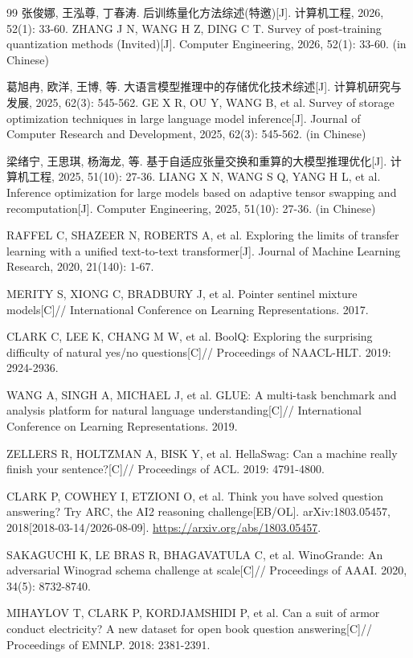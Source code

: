 \begin{thebibliography}{99}
张俊娜, 王泓尊, 丁春涛.
后训练量化方法综述(特邀)[J].
计算机工程, 2026, 52(1): 33-60.
ZHANG J N, WANG H Z, DING C T. Survey of post-training quantization methods (Invited)[J].
Computer Engineering, 2026, 52(1): 33-60. (in Chinese)

葛旭冉, 欧洋, 王博, 等.
大语言模型推理中的存储优化技术综述[J].
计算机研究与发展, 2025, 62(3): 545-562.
GE X R, OU Y, WANG B, et al. Survey of storage optimization techniques in large language model inference[J].
Journal of Computer Research and Development, 2025, 62(3): 545-562. (in Chinese)

梁绪宁, 王思琪, 杨海龙, 等.
基于自适应张量交换和重算的大模型推理优化[J].
计算机工程, 2025, 51(10): 27-36.
LIANG X N, WANG S Q, YANG H L, et al. Inference optimization for large models based on adaptive tensor swapping and recomputation[J].
Computer Engineering, 2025, 51(10): 27-36. (in Chinese)

RAFFEL C, SHAZEER N, ROBERTS A, et al.
Exploring the limits of transfer learning with a unified text-to-text transformer[J].
Journal of Machine Learning Research, 2020, 21(140): 1-67.

MERITY S, XIONG C, BRADBURY J, et al.
Pointer sentinel mixture models[C]//
International Conference on Learning Representations.
2017.

CLARK C, LEE K, CHANG M W, et al.
BoolQ: Exploring the surprising difficulty of natural yes/no questions[C]//
Proceedings of NAACL-HLT.
2019: 2924-2936.

WANG A, SINGH A, MICHAEL J, et al.
GLUE: A multi-task benchmark and analysis platform for natural language understanding[C]//
International Conference on Learning Representations.
2019.

ZELLERS R, HOLTZMAN A, BISK Y, et al.
HellaSwag: Can a machine really finish your sentence?[C]//
Proceedings of ACL.
2019: 4791-4800.

CLARK P, COWHEY I, ETZIONI O, et al.
Think you have solved question answering? Try ARC, the AI2 reasoning challenge[EB/OL].
arXiv:1803.05457, 2018[2018-03-14/2026-08-09].
\url{https://arxiv.org/abs/1803.05457}.

SAKAGUCHI K, LE BRAS R, BHAGAVATULA C, et al.
WinoGrande: An adversarial Winograd schema challenge at scale[C]//
Proceedings of AAAI.
2020, 34(5): 8732-8740.

MIHAYLOV T, CLARK P, KORDJAMSHIDI P, et al.
Can a suit of armor conduct electricity? A new dataset for open book question answering[C]//
Proceedings of EMNLP.
2018: 2381-2391.


\end{thebibliography}
